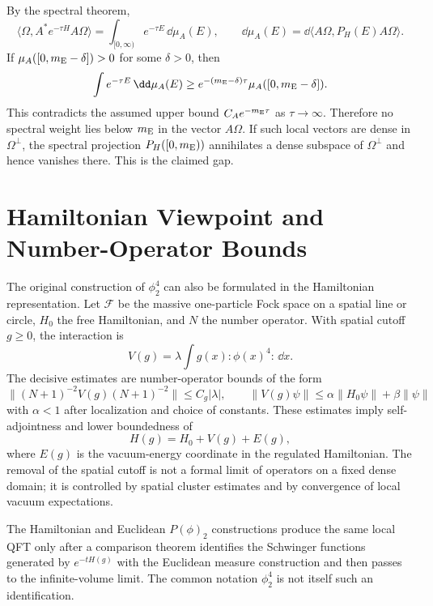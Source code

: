 By the spectral theorem,
\[
  \langle\Omega,A^*e^{-\tau H}A\Omega\rangle
  =
  \int_{[0,\infty)}e^{-\tau E}\,\dd\mu_A(E),
  \qquad
  \dd\mu_A(E)=\dd\langle A\Omega,P_H(E)A\Omega\rangle .
\]
If \(\mu_A([0,m_{\rm E}-\delta])>0\) for some \(\delta>0\), then
\[
  \int e^{-\tau E}\,\dd\mu_A(E)
  \geq
  e^{-(m_{\rm E}-\delta)\tau}\mu_A([0,m_{\rm E}-\delta]).
\]
This contradicts the assumed upper bound \(C_Ae^{-m_{\rm E}\tau}\) as
\(\tau\to\infty\).  Therefore no spectral weight lies below \(m_{\rm E}\) in
the vector \(A\Omega\).  If such local vectors are dense in
\(\Omega^\perp\), the spectral projection \(P_H([0,m_{\rm E}))\) annihilates
a dense subspace of \(\Omega^\perp\) and hence vanishes there.  This is the
claimed gap.

\section{Hamiltonian Viewpoint and Number-Operator Bounds}

The original construction of \(\phi^4_2\) can also be formulated in the
Hamiltonian representation.  Let \(\mathcal F\) be the massive one-particle
Fock space on a spatial line or circle, \(H_0\) the free Hamiltonian, and
\(N\) the number operator.  With spatial cutoff \(g\geq0\), the interaction
is
\[
  V(g)=\lambda\int g(x):\!\phi(x)^4\!:\,\dd x .
\]
The decisive estimates are number-operator bounds of the form
\begin{equation}
  \|(N+1)^{-2}V(g)(N+1)^{-2}\|
  \leq C_g|\lambda|,
  \qquad
  \|V(g)\psi\|
  \leq
  \alpha\|H_0\psi\|+\beta\|\psi\|
  \label{eq:constructive-number-operator-bound}
\end{equation}
with \(\alpha<1\) after localization and choice of constants.  These
estimates imply self-adjointness and lower boundedness of
\[
  H(g)=H_0+V(g)+E(g),
\]
where \(E(g)\) is the vacuum-energy coordinate in the regulated Hamiltonian.
The removal of the spatial cutoff is not a formal limit of operators on a
fixed dense domain; it is controlled by spatial cluster estimates and by
convergence of local vacuum expectations.

\begin{remark}
\label{rem:hamiltonian-euclidean-constructive-equivalence}
The Hamiltonian and Euclidean \(P(\phi)_2\) constructions produce the same
local QFT only after a comparison theorem identifies the Schwinger functions
generated by \(e^{-tH(g)}\) with the Euclidean measure construction and then
passes to the infinite-volume limit.  The common notation \(\phi^4_2\) is not
itself such an identification.
\end{remark}

